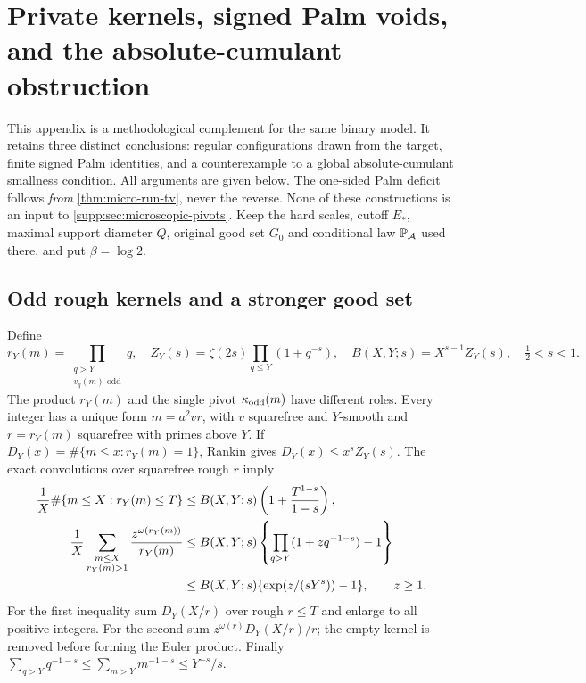 \section{Private kernels, signed Palm voids, and the absolute-cumulant obstruction}\label{supp:sec:palm-complements}
This appendix is a methodological complement for the same binary model.
It retains three distinct conclusions: regular configurations drawn from
the target, finite signed Palm identities, and a counterexample to a
global absolute-cumulant smallness condition. All arguments are given
below. The one-sided Palm deficit follows \emph{from}
\cref{thm:micro-run-tv}, never the reverse. None of these constructions
is an input to \cref{supp:sec:microscopic-pivots}.
Keep the hard scales, cutoff $E_*$, maximal support diameter $Q$, original
good set $G_0$ and conditional law $\mathbb P_{\mathcal A}$ used there, and put $\beta=\log2$.

\subsection{Odd rough kernels and a stronger good set}\label{supp:palm:subsec:regular}
Define
\[
 r_Y(m)=\prod_{\substack{q>Y\\v_q(m)\text{ odd}}}q,
 \quad Z_Y(s)=\zeta(2s)\prod_{q\le Y}(1+q^{-s}),
 \quad B(X,Y;s)=X^{s-1}Z_Y(s),\quad\tfrac12<s<1.
\]
The product $r_Y(m)$ and the single pivot $\kappa_{\rm odd}(m)$ have different roles. Every integer has a unique form $m=a^2vr$, with $v$ squarefree and $Y$-smooth and $r=r_Y(m)$ squarefree with primes above $Y$. If
$D_Y(x)=\#\{m\le x:r_Y(m)=1\}$, Rankin gives $D_Y(x)\le x^sZ_Y(s)$.
The exact convolutions over squarefree rough $r$ imply
\begin{align}
 \frac1X\#\{m\le X:r_Y(m)\le T\}
 &\le B(X,Y;s)\left(1+\frac{T^{1-s}}{1-s}\right),\label{supp:palm:eq:kernel-count}\\
 \frac1X\sum_{\substack{m\le X\\r_Y(m)>1}}
       \frac{z^{\omega(r_Y(m))}}{r_Y(m)}
 &\le B(X,Y;s)\left\{\prod_{q>Y}(1+zq^{-1-s})-1\right\}\notag\\
 &\le B(X,Y;s)\{\exp(z/(sY^s))-1\},\qquad z\ge1.\label{supp:palm:eq:kernel-reciprocal}
\end{align}
For the first inequality sum $D_Y(X/r)$ over rough $r\le T$ and enlarge to all positive integers. For the second sum $z^{\omega(r)}D_Y(X/r)/r$; the empty kernel is removed before forming the Euler product. Finally
$\sum_{q>Y}q^{-1-s}\le\sum_{m>Y}m^{-1-s}\le Y^{-s}/s$.

